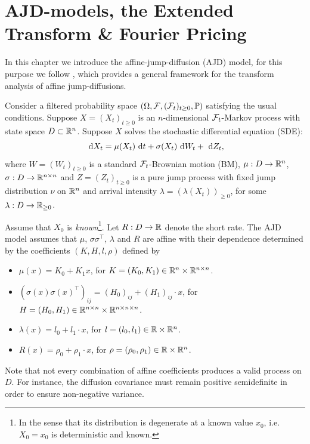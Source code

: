 \chapter{AJD-models, the Extended Transform \& Fourier Pricing}
\label{ch:affine}

In this chapter we introduce the affine-jump-diffusion (AJD) model, for this purpose we follow
\parencite{Duffie2000}, which provides a general framework for the transform analysis of affine
jump-diffusions.

Consider a filtered probability space $(\Omega, \mathcal{F}, (\mathcal{F}_t)_{t \ge 0}, \mathbb{P})$ satisfying the usual
conditions. Suppose $X = (X_t)_{t\ge 0}$ is an $n$-dimensional $\mathcal{F}_t$-Markov process with state
space $D \subset \mathbb{R}^{n}$. Suppose $X$ solves the stochastic differential equation (SDE):
\[ 
\text{ d} X_t = \mu(X_t) \text{ d} t + \sigma (X_t) \text{ d} W_t + \text{ d} Z_t
,\]
where $W = (W_{t})_{t\ge 0}$ is a standard $\mathcal{F}_t$-Brownian motion (BM), $\mu : D \to \mathbb{R}^{n}$,
$\sigma : D \to \mathbb{R}^{n \times n}$ and $Z = (Z_t)_{t\ge 0}$ is a pure jump process with fixed jump
distribution $\nu$ on $\mathbb{R}^{n}$ and arrival intensity $\lambda = (\lambda(X_t))_{\ge 0}$, for some
$\lambda: D \to \mathbb{R}_{\ge 0}$.

Assume that $X_0$ is \emph{known}\footnote{In the sense that its distribution is degenerate at a known value $x_0$, i.e. $X_0=x_0$ is deterministic and known.}.
Let $R: D \to \mathbb{R}$ denote the short rate. The AJD model assumes that $\mu$, $\sigma \sigma^{\top }$,
$\lambda$ and $R$ are affine with their dependence determined by the coefficients $(K, H, l, \rho)$
defined by
\begin{itemize}
\item $\mu(x) = K_0 + K_1 x$, for $K = (K_0, K_1) \in \mathbb{R}^{n}\times \mathbb{R}^{n \times n}$.  
\item $(\sigma(x) \sigma(x)^{\top })_{ij} = (H_0)_{ij} + (H_1)_{ij} \cdot x$,  
  for $H = (H_0, H_1) \in\mathbb{R}^{n \times  n} \times  \mathbb{R}^{n \times  n \times  n}$.
\item $\lambda(x) = l_0 + l_1 \cdot  x$, for $l = (l_0, l_1) \in \mathbb{R} \times  \mathbb{R}^{n}$.
\item $R(x) = \rho_0 + \rho_1\cdot x$, for $\rho = (\rho_0, \rho_1) \in \mathbb{R} \times \mathbb{R}^{n}$.
\end{itemize}
\begin{note}
    Note that not every combination of affine coefficients produces a valid process on $D$. 
    For instance, the diffusion covariance must remain positive semidefinite in order to ensure
    non-negative variance.
\end{note}

